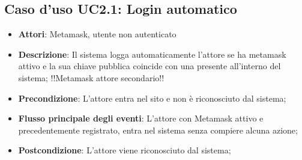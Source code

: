 \subsection{Caso d'uso \texorpdfstring{UC2.1}{UC2.1}: Login automatico}
\begin{itemize}
\item \textbf{Attori}: Metamask, utente non autenticato
\item \textbf{Descrizione}: Il sistema logga automaticamente l'attore se ha metamask attivo e la sua chiave pubblica coincide con una presente all'interno del sistema;
!!Metamask attore secondario!!
\item \textbf{Precondizione}: L'attore entra nel sito e non è riconosciuto dal sistema;
\item \textbf{Flusso principale degli eventi}: L'attore con Metamask attivo e precedentemente registrato, entra nel sistema senza compiere alcuna azione;
\item \textbf{Postcondizione}: L'attore viene riconosciuto dal sistema;
\end{itemize}
